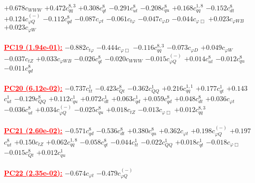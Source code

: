 \documentclass{article}
\begin{document}
{$+0.678$}{\rm $c_{WWW}$}
{$+0.472$}{\rm $c_{qq}^{8,3}$}
{$+0.308$}{\rm $c_{qt}^{8}$}
{$-0.291$}{\rm $c_{ut}^{8}$}
{$-0.208$}{\rm $c_{qu}^{8}$}
{$+0.168$}{\rm $c_{qq}^{1,8}$}
{$-0.152$}{\rm $c_{dt}^{8}$}
{$+0.124$}{\rm $c_{\varphi Q}^{(-)}$}
{$-0.112$}{\rm $c_{qd}^{8}$}
{$-0.087$}{\rm $c_{\varphi t}$}
{$-0.061$}{\rm $c_{t \varphi}$}
{$-0.047$}{\rm $c_{\varphi D}$}
{$-0.044$}{\rm $c_{\varphi \Box}$}
{$+0.023$}{\rm $c_{\varphi WB}$}
{$+0.023$}{\rm $c_{\varphi W}$}
 \nonumber \\ \nonumber \\
\noindent \textcolor{red}{\underline{\bf{PC19} (1.94e-01):}}
{$-0.882$}{\rm $c_{t \varphi}$}
{$-0.444$}{\rm $c_{\varphi \Box}$}
{$-0.116$}{\rm $c_{qq}^{8,3}$}
{$-0.073$}{\rm $c_{\varphi D}$}
{$+0.049$}{\rm $c_{\varphi W}$}
{$-0.037$}{\rm $c_{tZ}$}
{$+0.033$}{\rm $c_{\varphi WB}$}
{$-0.026$}{\rm $c_{qt}^{8}$}
{$-0.020$}{\rm $c_{WWW}$}
{$-0.015$}{\rm $c_{\varphi Q}^{(-)}$}
{$+0.014$}{\rm $c_{ut}^{8}$}
{$-0.012$}{\rm $c_{qu}^{8}$}
{$-0.011$}{\rm $c_{qd}^{8}$}
 \nonumber \\ \nonumber \\
\noindent \textcolor{red}{\underline{\bf{PC20} (6.12e-02):}}
{$-0.737$}{\rm $c_{tt}^{1}$}
{$-0.423$}{\rm $c_{Qt}^{8}$}
{$-0.362$}{\rm $c_{QQ}^{1}$}
{$+0.216$}{\rm $c_{qq}^{1,1}$}
{$+0.177$}{\rm $c_{qt}^{1}$}
{$+0.143$}{\rm $c_{ut}^{1}$}
{$-0.129$}{\rm $c_{QQ}^{8}$}
{$+0.112$}{\rm $c_{qu}^{1}$}
{$+0.072$}{\rm $c_{dt}^{1}$}
{$+0.063$}{\rm $c_{qd}^{1}$}
{$+0.059$}{\rm $c_{qd}^{8}$}
{$+0.048$}{\rm $c_{dt}^{8}$}
{$+0.036$}{\rm $c_{\varphi t}$}
{$-0.036$}{\rm $c_{ut}^{8}$}
{$+0.034$}{\rm $c_{\varphi Q}^{(-)}$}
{$-0.025$}{\rm $c_{qu}^{8}$}
{$+0.018$}{\rm $c_{tZ}$}
{$-0.013$}{\rm $c_{\varphi \Box}$}
{$+0.012$}{\rm $c_{qq}^{8,3}$}
 \nonumber \\ \nonumber \\
\noindent \textcolor{red}{\underline{\bf{PC21} (2.60e-02):}}
{$-0.571$}{\rm $c_{qd}^{8}$}
{$-0.536$}{\rm $c_{dt}^{8}$}
{$+0.380$}{\rm $c_{qu}^{8}$}
{$+0.362$}{\rm $c_{\varphi t}$}
{$+0.198$}{\rm $c_{\varphi Q}^{(-)}$}
{$+0.197$}{\rm $c_{ut}^{8}$}
{$+0.150$}{\rm $c_{tZ}$}
{$+0.062$}{\rm $c_{qq}^{1,8}$}
{$-0.058$}{\rm $c_{qt}^{8}$}
{$-0.044$}{\rm $c_{tt}^{1}$}
{$-0.022$}{\rm $c_{QQ}^{1}$}
{$+0.018$}{\rm $c_{qt}^{1}$}
{$-0.018$}{\rm $c_{\varphi \Box}$}
{$-0.015$}{\rm $c_{Qt}^{8}$}
{$+0.012$}{\rm $c_{qu}^{1}$}
 \nonumber \\ \nonumber \\
\noindent \textcolor{red}{\underline{\bf{PC22} (2.35e-02):}}
{$-0.674$}{\rm $c_{\varphi t}$}
{$-0.479$}{\rm $c_{\varphi Q}^{(-)}$}
\end{document}
